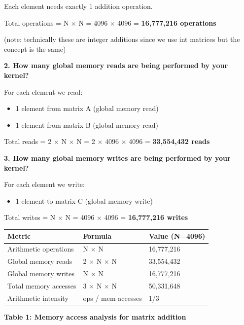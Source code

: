 \documentclass[12pt]{article}
\begin{document}
\vspace{0.3cm}

Each element needs exactly 1 addition operation.

Total operations = N $\times$ N = 4096 $\times$ 4096 = \textbf{16,777,216 operations}

(note: technically these are integer additions since we use int matrices but the concept is the same)

\vspace{0.5cm}

\textbf{2. How many global memory reads are being performed by your kernel?}

\vspace{0.3cm}

For each element we read:
\begin{itemize}
\item 1 element from matrix A (global memory read)
\item 1 element from matrix B (global memory read)
\end{itemize}

Total reads = 2 $\times$ N $\times$ N = 2 $\times$ 4096 $\times$ 4096 = \textbf{33,554,432 reads}

\vspace{0.5cm}

\textbf{3. How many global memory writes are being performed by your kernel?}

\vspace{0.3cm}

For each element we write:
\begin{itemize}
\item 1 element to matrix C (global memory write)
\end{itemize}

Total writes = N $\times$ N = 4096 $\times$ 4096 = \textbf{16,777,216 writes}

\vspace{0.5cm}

\begin{center}
\begin{tabular}{|p{5cm}|p{4cm}|p{4cm}|}
\hline
\textbf{Metric} & \textbf{Formula} & \textbf{Value (N=4096)} \\
\hline
Arithmetic operations & N $\times$ N & 16,777,216 \\
\hline
Global memory reads & 2 $\times$ N $\times$ N & 33,554,432 \\
\hline
Global memory writes & N $\times$ N & 16,777,216 \\
\hline
Total memory accesses & 3 $\times$ N $\times$ N & 50,331,648 \\
\hline
Arithmetic intensity & ops / mem accesses & 1/3 \\
\hline
\end{tabular}
\end{center}
\vspace{0.2cm}
\begin{center}
\textbf{Table 1: Memory access analysis for matrix addition}
\end{center}
\end{document}
